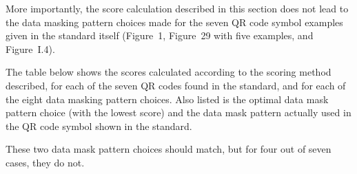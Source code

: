\documentclass[a4paper,twoside]{article}
\begin{document}
More importantly, the score calculation described in this section does not lead to the data masking
pattern choices made for the seven QR code symbol examples given in the standard itself (Figure~1,
Figure~29 with five examples, and Figure~I.4).

The table below shows the scores calculated according to the scoring method described, for each of the seven QR codes
found in the standard, and for each of the eight data masking pattern choices. Also listed is the optimal data mask
pattern choice (with the  lowest score) and the data mask pattern actually used in the QR code symbol shown in the standard.

These two data mask pattern choices should match, but for four out of seven cases, they do not.

\end{document}
